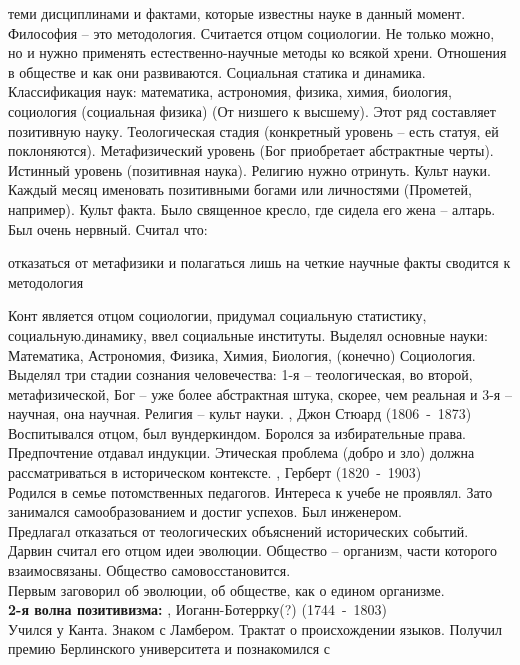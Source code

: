 \documentclass[a4paper,12pt]{report} %
\begin{document}
\begin{itemize}
теми дисциплинами и фактами, которые известны науке в данный
момент. Философия -- это методология. Считается отцом социологии. Не
только можно, но и нужно применять естественно-научные методы ко
всякой хрени. Отношения в обществе и как они развиваются. Социальная
статика и динамика. Классификация наук: математика, астрономия,
физика, химия, биология, социология (социальная физика) (От низшего к
высшему). Этот ряд составляет позитивную науку. Теологическая стадия
(конкретный уровень -- есть статуя, ей поклоняются). Метафизический
уровень (Бог приобретает абстрактные черты). Истинный уровень
(позитивная наука). Религию нужно отринуть. Культ науки. Каждый месяц
именовать позитивными богами или личностями (Прометей,
например). Культ факта. Было священное кресло, где сидела его жена
-- алтарь. \\
Был очень нервный. Считал что:
\begin{itemize}
 отказаться от метафизики и полагаться лишь на четкие научные факты
 сводится к методология
\end{itemize}
Конт является отцом социологии, придумал социальную статистику, социальную.динамику, ввел социальные институты.
Выделял основные науки: Математика, Астрономия, Физика, Химия, Биология, (конечно) Социология.
Выделял три стадии сознания человечества: 1-я –  теологическая, во второй, метафизической, Бог – уже более абстрактная штука, скорее, чем реальная и 3-я – научная, она научная. 
Религия – культ науки.
, Джон Стюард (1806~-~1873)\\
Воспитывался отцом, был вундеркиндом. Боролся за избирательные
права. Предпочтение отдавал индукции. Этическая проблема (добро и зло)
должна рассматриваться в историческом контексте.
, Герберт (1820~-~1903)\\
Родился в семье потомственных педагогов. Интереса к учебе не
проявлял. Зато занимался самообразованием и достиг успехов. Был
инженером. \\
Предлагал отказаться от теологических объяснений исторических
событий. Дарвин считал его отцом идеи эволюции. Общество -- организм,
части которого взаимосвязаны. Общество самовосстановится.\\
Первым заговорил об эволюции, об обществе, как о едином организме.\\
\textbf{2-я волна позитивизма:}
, Иоганн-Ботеррку(?) (1744~-~1803)\\
Учился у Канта. Знаком с Ламбером. Трактат о происхождении
языков. Получил премию Берлинского университета и познакомился с

\end{itemize}
\end{document}
